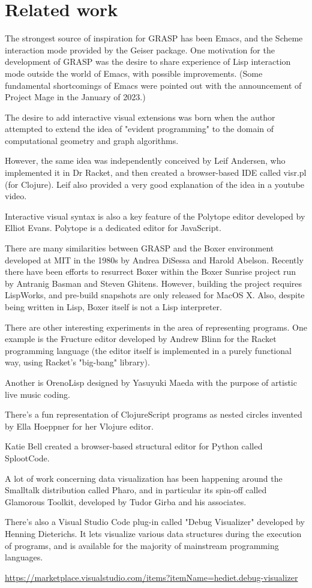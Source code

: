 \documentclass[sigconf]{acmart}
\begin{document}
\section{Related work}

The strongest source of inspiration for GRASP
has been Emacs, and the Scheme interaction
mode provided by the Geiser package. One
motivation for the development of GRASP was
the desire to share experience of Lisp interaction
mode outside the world of Emacs, with possible
improvements. (Some fundamental shortcomings
of Emacs were pointed out with the announcement
of Project Mage in the January of 2023.)

The desire to add interactive visual extensions
was born when the author attempted to extend
the idea of "evident programming" to the domain
of computational geometry and graph algorithms.

However, the same idea was independently
conceived by Leif Andersen, who implemented
it in Dr Racket, and then created a browser-based
IDE called visr.pl (for Clojure). Leif also provided
a very good explanation of the idea in a youtube video.

Interactive visual syntax is also a key feature
of the Polytope editor developed by Elliot Evans.
Polytope is a dedicated editor for JavaScript.

There are many similarities between GRASP and
the Boxer environment developed at MIT in the 1980s
by Andrea DiSessa and Harold Abelson. Recently
there have been efforts to resurrect Boxer
within the Boxer Sunrise project run by Antranig
Basman and Steven Ghitens. However, building
the project requires LispWorks, and pre-build
snapshots are only released for MacOS X. Also,
despite being written in Lisp, Boxer itself
is not a Lisp interpreter.

There are other interesting experiments
in the area of representing programs.
One example is the Fructure editor developed
by Andrew Blinn for the Racket programming
language (the editor itself is implemented
in a purely functional way, using Racket's
"big-bang" library).

Another is OrenoLisp designed by Yasuyuki
Maeda with the purpose of artistic live
music coding.

There's a fun representation of ClojureScript
programs as nested circles invented by Ella
Hoeppner for her Vlojure editor.

Katie Bell created a browser-based structural
editor for Python called SplootCode.

A lot of work concerning data visualization
has been happening around the Smalltalk
distribution called Pharo, and in particular
its spin-off called Glamorous Toolkit, developed
by Tudor Girba and his associates.

There's also a Visual Studio Code plug-in
called "Debug Visualizer" developed by Henning
Dieterichs. It lets visualize various data structures
during the execution of programs, and is available
for the majority of mainstream programming languages.

\url{https://marketplace.visualstudio.com/items?itemName=hediet.debug-visualizer}
\end{document}
